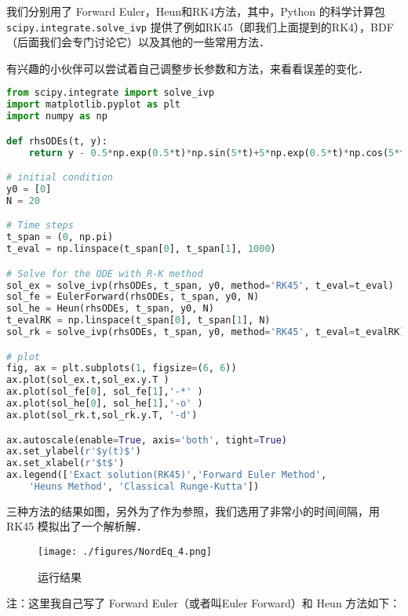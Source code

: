 我们分别用了 Forward Euler，Heun和RK4方法，其中，Python 的科学计算包 \verb|scipy.integrate.solve_ivp| 提供了例如RK45（即我们上面提到的RK4），BDF（后面我们会专门讨论它）以及其他的一些常用方法．

有兴趣的小伙伴可以尝试着自己调整步长参数和方法，来看看误差的变化．
\begin{lstlisting}[language=python]
from scipy.integrate import solve_ivp
import matplotlib.pyplot as plt
import numpy as np

def rhsODEs(t, y):
    return y - 0.5*np.exp(0.5*t)*np.sin(5*t)+5*np.exp(0.5*t)*np.cos(5*t)

# initial condition
y0 = [0]
N = 20

# Time steps
t_span = (0, np.pi)
t_eval = np.linspace(t_span[0], t_span[1], 1000)

# Solve for the ODE with R-K method
sol_ex = solve_ivp(rhsODEs, t_span, y0, method='RK45', t_eval=t_eval)
sol_fe = EulerForward(rhsODEs, t_span, y0, N)
sol_he = Heun(rhsODEs, t_span, y0, N)
t_evalRK = np.linspace(t_span[0], t_span[1], N)
sol_rk = solve_ivp(rhsODEs, t_span, y0, method='RK45', t_eval=t_evalRK)

# plot
fig, ax = plt.subplots(1, figsize=(6, 6))
ax.plot(sol_ex.t,sol_ex.y.T )
ax.plot(sol_fe[0], sol_fe[1],'-*' )
ax.plot(sol_he[0], sol_he[1],'-o' )
ax.plot(sol_rk.t,sol_rk.y.T, '-d')

ax.autoscale(enable=True, axis='both', tight=True)
ax.set_ylabel(r'$y(t)$')
ax.set_xlabel(r'$t$')
ax.legend(['Exact solution(RK45)','Forward Euler Method',
    'Heuns Method', 'Classical Runge-Kutta'])
\end{lstlisting}

三种方法的结果如图，另外为了作为参照，我们选用了非常小的时间间隔，用 RK45 模拟出了一个解析解．

\begin{figure}[ht]
\centering
\texttt{[image: ./figures/NordEq\_4.png]}
\caption{运行结果} \label{NordEq_fig4}
\end{figure}

注：这里我自己写了 Forward Euler（或者叫Euler Forward）和 Heun 方法如下：


